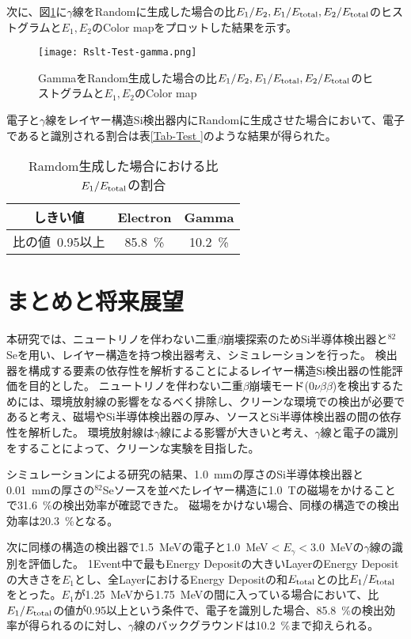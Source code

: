 \documentclass[a4paper,10pt]{jreport}
\begin{document}
次に、図\ref{Rslt-Test-gamma}に$\gamma$線をRandomに生成した場合の比$E_1/E_2,E_1/E_{\rm{total}},E_2/E_{\rm{total}}$のヒストグラムと$E_1,E_2$のColor mapをプロットした結果を示す。

\begin{figure}[H]
	\center
	\texttt{[image: Rslt-Test-gamma.png]}
	\caption{GammaをRandom生成した場合の比$E_1/E_2,E_1/E_{\rm{total}},E_2/E_{\rm{total}}$のヒストグラムと$E_1,E_2$のColor map}
	\label{Rslt-Test-gamma}
\end{figure}

電子と$\gamma$線をレイヤー構造Si検出器内にRandomに生成させた場合において、電子であると識別される割合は表\ref{Tab-Test
}のような結果が得られた。

\begin{table}[H]
	\center
	\caption{Ramdom生成した場合における比$E_1/E_{\rm{total}}$の割合} \label{Tab-Test}
	\begin{tabular}{ccc}
		\hline
		しきい値 & Electron & Gamma\\
		\hline
		比の値\ 0.95以上 & \SI{85.8}{\%}   & \SI{10.2}{\%} \\
		\hline
	\end{tabular}
\end{table}




\chapter*{まとめと将来展望}

本研究では、ニュートリノを伴わない二重$\beta$崩壊探索のためSi半導体検出器と$^{82}$Seを用い、レイヤー構造を持つ検出器考え、シミュレーションを行った。
検出器を構成する要素の依存性を解析することによるレイヤー構造Si検出器の性能評価を目的とした。
ニュートリノを伴わない二重$\beta$崩壊モード($0\nu\beta\beta$)を検出するためには、環境放射線の影響をなるべく排除し、クリーンな環境での検出が必要であると考え、磁場やSi半導体検出器の厚み、ソースとSi半導体検出器の間の依存性を解析した。
環境放射線は$\gamma$線による影響が大きいと考え、$\gamma$線と電子の識別をすることによって、クリーンな実験を目指した。

シミュレーションによる研究の結果、\SI{1.0}{mm}の厚さのSi半導体検出器と\SI{0.01}{mm}の厚さの$^{82}$Seソースを並べたレイヤー構造に\SI{1.0}{T}の磁場をかけることで\SI{31.6}{\%}の検出効率が確認できた。
磁場をかけない場合、同様の構造での検出効率は\SI{20.3}{\%}となる。

次に同様の構造の検出器で\SI{1.5}{MeV}の電子と\SI{1.0}{MeV}$<E_{\gamma}<$\SI{3.0}{MeV}の$\gamma$線の識別を評価した。
1Event中で最もEnergy Depositの大きいLayerのEnergy Depositの大きさを$E_1$とし、全LayerにおけるEnergy Depositの和$E_{\rm{total}}$との比$E_1/E_{\rm{total}}$をとった。$E_1$が\SI{1.25}{MeV}から\SI{1.75}{MeV}の間に入っている場合において、比$E_1/E_{\rm{total}}$の値が0.95以上という条件で、電子を識別した場合、\SI{85.8}{\%}の検出効率が得られるのに対し、$\gamma$線のバックグラウンドは\SI{10.2}{\%}まで抑えられる。
\end{document}
